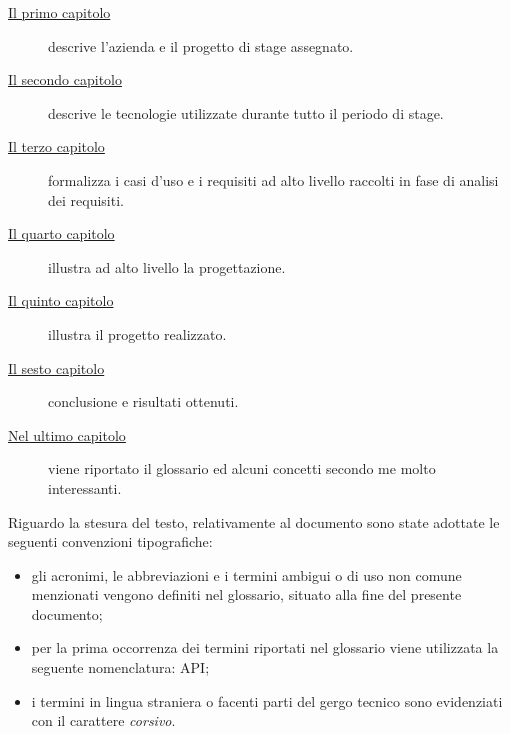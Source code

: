 \begin{description}
	\item[{\hyperref[cap:introduzione]{Il primo capitolo}}] descrive l’azienda e il progetto di stage assegnato.
	
	\item[{\hyperref[cap:Tecnologie utilizzate]{Il secondo capitolo}}] descrive le tecnologie utilizzate durante
	tutto il periodo di stage.
	
	\item[{\hyperref[cap:analisi-requisiti]{Il terzo capitolo}}] formalizza i casi d’uso e i requisiti ad alto livello raccolti in fase di
	analisi dei requisiti.
	
	\item[{\hyperref[cap:progettazione]{Il quarto capitolo}}] illustra ad alto livello la progettazione.
	
		\item[{\hyperref[cap:progetto-terminato]{Il quinto capitolo}}] illustra il progetto realizzato.
	
	\item[{\hyperref[cap:conclusioni]{Il sesto capitolo}}] conclusione e risultati ottenuti.
	
	\item[{\hyperref[cap:conclusioni]{Nel ultimo capitolo}}] viene riportato il glossario ed alcuni concetti secondo me molto interessanti.
\end{description}
Riguardo la stesura del testo, relativamente al documento sono state adottate le seguenti convenzioni tipografiche:
\begin{itemize}
	\item gli acronimi, le abbreviazioni e i termini ambigui o di uso non comune menzionati vengono definiti nel glossario, situato alla fine del presente documento;
	\item per la prima occorrenza dei termini riportati nel glossario viene utilizzata la seguente nomenclatura: \gls{API};
	\item i termini in lingua straniera o facenti parti del gergo tecnico sono evidenziati con il carattere \emph{corsivo}.
\end{itemize}
\endgroup			
\vfill

